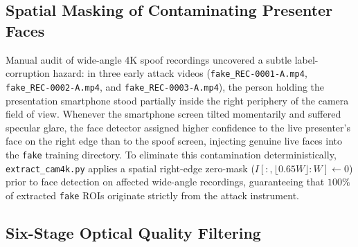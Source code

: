 \subsection{Spatial Masking of Contaminating Presenter Faces}

Manual audit of wide-angle 4K spoof recordings uncovered a subtle label-corruption hazard: in three early attack videos (\texttt{fake\_REC-0001-A.mp4}, \texttt{fake\_REC-0002-A.mp4}, and \texttt{fake\_REC-0003-A.mp4}), the person holding the presentation smartphone stood partially inside the right periphery of the camera field of view. Whenever the smartphone screen tilted momentarily and suffered specular glare, the face detector assigned higher confidence to the live presenter's face on the right edge than to the spoof screen, injecting genuine live faces into the \texttt{fake} training directory. To eliminate this contamination deterministically, \texttt{extract\_cam4k.py} applies a spatial right-edge zero-mask ($I[:, \lfloor 0.65 W \rfloor : W] \leftarrow 0$) prior to face detection on affected wide-angle recordings, guaranteeing that $100\%$ of extracted \texttt{fake} ROIs originate strictly from the attack instrument.

\subsection{Six-Stage Optical Quality Filtering}

